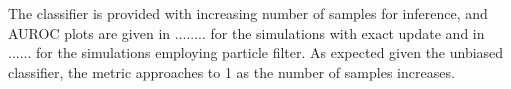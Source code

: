 The classifier is provided with increasing number of samples for inference, and AUROC plots are given in ........ for the simulations with exact update and in ...... for the simulations employing particle filter. As expected given the unbiased classifier, the metric approaches to 1 as the number of samples increases. %
%
